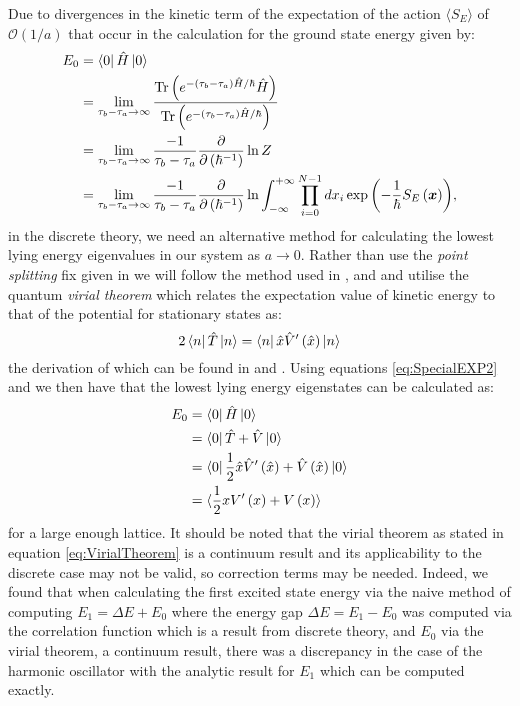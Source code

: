 \documentclass[12pt]{article}
\begin{document}
        Due to divergences in the kinetic term of the expectation of the action $\langle S_{E} \rangle$ of $\mathcal{O}\left(1/a\right) $\cite{creutz_freedman_1981} that occur in the calculation for the ground state energy given by:
        \begin{align}
            E_{0} & = \bra{0}\hat{H}\ket{0} \\
                  & = \lim_{\tau_b-\tau_a \rightarrow \infty} \frac{\text{Tr}\left(e^{-\left(\tau_b-\tau_a\right)\hat{H}/\hbar}\hat{H}\right)}{\text{Tr}\left(e^{-\left(\tau_b-\tau_a\right)\hat{H}/\hbar}\right)} \\
                  & = \lim_{\tau_b-\tau_a \rightarrow \infty} \frac{-1}{\tau_b-\tau_a} \frac{\partial}{\partial\left(\hbar^{-1}\right)}\ln{Z} \\
                  & = \lim_{\tau_b-\tau_a \rightarrow \infty} \frac{-1}{\tau_b-\tau_a} \frac{\partial}{\partial\left(\hbar^{-1}\right)}\ln \int^{+\infty}_{-\infty}\prod_{i=0}^{N-1}dx_i \exp{\left(-\frac{1}{\hbar}S_{E}\left(\bm{x}\right)\right)},
        \end{align}
        in the discrete theory, we need an alternative method for calculating the lowest lying energy eigenvalues in our system as $a\rightarrow 0$. Rather than use the \textit{point splitting} fix given in \cite{feynman_hibbs_1965} we will follow the method used in \cite{creutz_freedman_1981}, \cite{rodgers_raes} and \cite{slapik_serenone} and utilise the quantum \textit{virial theorem} which relates the expectation value of kinetic energy to that of the potential for stationary states as:
        \begin{equation}
            \label{eq:VirialTheorem}
            2\bra{n} \hat{T} \ket{n} = \bra{n} \hat{x} \hat{V}'\left(\hat{x}\right) \ket{n}
        \end{equation}
         the derivation of which can be found in \cite{binney_skinner_2015} and \cite{fock_1930}. Using equations \ref{eq:SpecialEXP2} and \label{eq:LargeLatticeExpectation} we then have that the lowest lying energy eigenstates can be calculated as:
         \begin{align}
            E_0  & = \bra{0}\hat{H}\ket{0} \\
                 & = \bra{0}\hat{T}+\hat{V}\ket{0}\\
                 & = \bra{0}\frac{1}{2}\hat{x}\hat{V}'\left(\hat{x}\right)+\hat{V}\left(\hat{x}\right)\ket{0}\\
                 & = \langle \frac{1}{2}xV'\left(x\right) +  V\left(x\right) \rangle
         \end{align}
         for a large enough lattice. It should be noted that the virial theorem as stated in equation \ref{eq:VirialTheorem} is a continuum result and its applicability to the discrete case may not be valid, so correction terms may be needed. Indeed, we found that when calculating the first excited state energy via the naive method of computing $E_1 = \Delta E + E_0$ where the energy gap $\Delta E = E_1 - E_0$ was computed via the correlation function which is a result from discrete theory, and $E_0$ via the virial theorem, a continuum result, there was a discrepancy in the case of the harmonic oscillator with the analytic result for $E_1$ which can be computed exactly.
        
\end{document}
